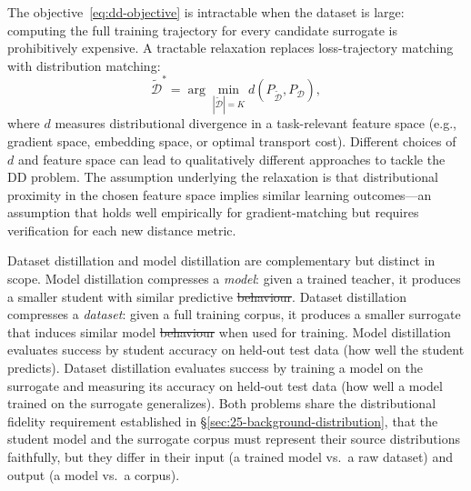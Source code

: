 \documentclass[12pt, a4paper, twoside]{book}
\makeatletter
\numberwithin{equation}{chapter}
\theoremstyle{plain}
\theoremstyle{definition}
\theoremstyle{remark}
\newenvironment{foldable}{}{}
\newcommand*{\eg}{e.g.}
\providecommand{\DIFaddtex}[1]{{\protect\color{blue}\uwave{#1}}} %
\providecommand{\DIFdeltex}[1]{{\protect\color{red}\sout{#1}}} %
\providecommand{\DIFaddbegin}{} %
\providecommand{\DIFaddend}{} %
\providecommand{\DIFdelbegin}{} %
\providecommand{\DIFdelend}{} %
\providecommand{\DIFadd}[1]{\texorpdfstring{\DIFaddtex{#1}}{#1}} %
\providecommand{\DIFdel}[1]{\texorpdfstring{\DIFdeltex{#1}}{}} %
\newcommand{\DIFscaledelfig}{0.5}
\newlength{\DIFdelgraphicswidth} %
\newlength{\DIFdelgraphicsheight} %
\newcommand{\DIFaddincludegraphics}[2][]{{\color{blue}\fbox{\DIFOincludegraphics[#1]{#2}}}} %
\newcommand{\DIFdelincludegraphics}[2][]{%
\sbox{\DIFdelgraphicsbox}{\DIFOincludegraphics[#1]{#2}}%
\settoboxwidth{\DIFdelgraphicswidth}{\DIFdelgraphicsbox} %
\settoboxtotalheight{\DIFdelgraphicsheight}{\DIFdelgraphicsbox} %
\scalebox{\DIFscaledelfig}{%
\parbox[b]{\DIFdelgraphicswidth}{\usebox{\DIFdelgraphicsbox}\\[-\baselineskip] \rule{\DIFdelgraphicswidth}{0em}}\llap{\resizebox{\DIFdelgraphicswidth}{\DIFdelgraphicsheight}{%
\setlength{\unitlength}{\DIFdelgraphicswidth}%
\begin{picture}(1,1)%
\thicklines\linethickness{2pt} %
{\color[rgb]{1,0,0}\put(0,0){\framebox(1,1){}}}%
{\color[rgb]{1,0,0}\put(0,0){\line( 1,1){1}}}%
{\color[rgb]{1,0,0}\put(0,1){\line(1,-1){1}}}%
\end{picture}%
}\hspace*{3pt}}} %
} %
\DeclareRobustCommand{\DIFaddbegin}{\DIFOaddbegin \let\includegraphics\DIFaddincludegraphics} %
\DeclareRobustCommand{\DIFaddend}{\DIFOaddend \let\includegraphics\DIFOincludegraphics} %
\DeclareRobustCommand{\DIFdelbegin}{\DIFOdelbegin \let\includegraphics\DIFdelincludegraphics} %
\DeclareRobustCommand{\DIFdelend}{\DIFOaddend \let\includegraphics\DIFOincludegraphics} %
\let\sout@orig\sout %
\renewcommand{\sout}[1]{\ifmmode\text{\sout@orig{\ensuremath{#1}}}\else\sout@orig{#1}\fi} %
\makeatother
\begin{document}
\begin{foldable}
  The objective~\eqref{eq:dd-objective} is intractable when the dataset is large: computing the full training trajectory for every candidate surrogate is prohibitively expensive.
  A tractable relaxation replaces loss-trajectory matching with distribution matching:
  \begin{equation}
    \tilde{\mathcal{D}}^{*} = \arg\min_{|\tilde{\mathcal{D}}|=K} d(P_{\tilde{\mathcal{D}}}, P_{\mathcal{D}}),
    \label{eq:dm-abstract}
  \end{equation}
  where $d$ measures distributional divergence in a task-relevant feature space (\eg, gradient space, embedding space, or optimal transport cost).
  Different choices of $d$ and feature space can lead to qualitatively different approaches to tackle the \ac{DD} problem.
  The assumption underlying the relaxation is that distributional proximity in the chosen feature space implies similar learning outcomes---an assumption that holds well empirically for gradient-matching but requires verification for each new distance metric.
\end{foldable}

\begin{foldable}
  Dataset distillation and model distillation are complementary but distinct in scope.
  Model distillation compresses a \textit{model}: given a trained teacher, it produces a smaller student with similar predictive \DIFdelbegin \DIFdel{behaviour}\DIFdelend \DIFaddbegin \DIFadd{behavior}\DIFaddend .
  Dataset distillation compresses a \textit{dataset}: given a full training corpus, it produces a smaller surrogate that induces similar model \DIFdelbegin \DIFdel{behaviour }\DIFdelend \DIFaddbegin \DIFadd{behavior }\DIFaddend when used for training.
  Model distillation evaluates success by student accuracy on held-out test data (how well the student predicts).
  Dataset distillation evaluates success by training a model on the surrogate and measuring its accuracy on held-out test data (how well a model trained on the surrogate generalizes).
  Both problems share the distributional fidelity requirement established in \S\ref{sec:25-background-distribution}, that the student model and the surrogate corpus must represent their source distributions faithfully, but they differ in their input (a trained model vs.\ a raw dataset) and output (a model vs.\ a corpus).
\end{foldable}
\end{document}
